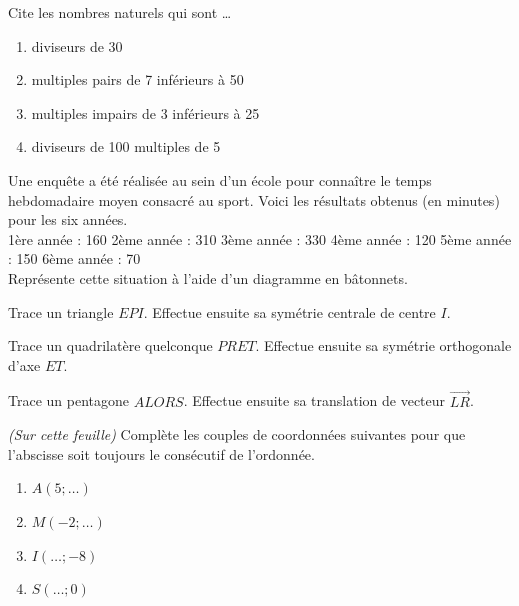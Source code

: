 \documentclass[10pt,a4paper]{article}
\begin{document}
\begin{exercise}
    Cite les nombres naturels qui sont \dots
    \begin{enumerate}[cols=2]
        \item diviseurs de 30
        \item multiples pairs de 7 inférieurs à 50
        \item multiples impairs de 3 inférieurs à 25
        \item diviseurs de 100 multiples de 5
    \end{enumerate}
\end{exercise}

\begin{exercise}
	Une enquête a été réalisée au sein d’un école pour connaître le temps hebdomadaire moyen consacré au sport. Voici les résultats obtenus (en minutes) pour les six années. \\
	1ère année : 160 \hfill 2ème année : 310 \hfill 3ème année : 330 \hfill 4ème année : 120 \hfill 5ème année : 150 \hfill 6ème année : 70 \\
	Représente cette situation à l’aide d’un diagramme en bâtonnets.
\end{exercise}

\begin{exercise}
	Trace un triangle \(EPI\). Effectue ensuite sa symétrie centrale de centre \(I\).
\end{exercise}

\begin{exercise}
	Trace un quadrilatère quelconque \(PRET\). Effectue ensuite sa symétrie orthogonale d'axe \(ET\).
\end{exercise}

\begin{exercise}
	Trace un pentagone \(ALORS\). Effectue ensuite sa translation de vecteur \(\overrightarrow{LR}\).
\end{exercise}

\pagebreak
\begin{exercise}
    \emph{(Sur cette feuille)} Complète les couples de coordonnées suivantes pour que l'abscisse soit toujours le consécutif de l'ordonnée. 
    \begin{enumerate}[cols=4, label=]
        \item $A\left(5; \ldots\right)$
        \item $M\left(-2; \ldots \right)$
        \item $I\left(\ldots ; -8\right)$
        \item $S\left(\ldots ; 0\right)$
    \end{enumerate}
\end{exercise}
\end{document}

